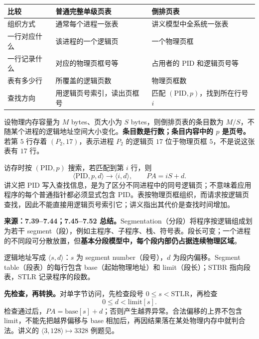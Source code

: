 \begin{center}
\begin{tabularx}{\textwidth}{@{}>{\raggedright\arraybackslash}p{3.0cm}>{\raggedright\arraybackslash}X>{\raggedright\arraybackslash}X@{}}
\toprule
比较 & 普通完整单级页表 & 倒排页表 \\
\midrule
组织方式 & 通常每个进程一张表 & 讲义模型中全系统一张表 \\
一行对应什么 & 该进程的一个逻辑页 & 一个物理页框 \\
一行记录什么 & 对应的物理页框号等 & 占用者的 PID 和逻辑页号等 \\
表有多少行 & 所覆盖的逻辑页数 & 物理页框数 \\
查找方向 & 用逻辑页号索引，读出页框号 & 匹配 $(\mathrm{PID},p)$，找到所在行号 $i$ \\
\bottomrule
\end{tabularx}
\end{center}

设物理内存容量为 $M$ bytes、页大小为 $S$ bytes，则倒排页表的条目数为 $M/S$，不随某个进程的逻辑地址空间大小变化。\textbf{条目数是行数；条目内容中的 $p$ 是页号。}若第 $5$ 行存着 $(P_2,17)$，表示进程 $P_2$ 的逻辑页 $17$ 位于物理页框 $5$，不是说这张表有 $17$ 行。

访存时按 $(\mathrm{PID},p)$ 搜索，若匹配到第 $i$ 行，则
\[
 \langle\mathrm{PID},p,d\rangle\longrightarrow\langle i,d\rangle,
 \qquad PA=iS+d.
\]
讲义把 PID 写入查找信息，是为了区分不同进程中的同号逻辑页；不意味着应用程序的每个普通指针都必须显式包含 PID。表按物理页框组织，而请求按逻辑页查找，因此不能直接用逻辑页号索引它；讲义指出其代价是查找时间增加。


\textbf{来源：7.39--7.44；7.45--7.52 总结。}Segmentation（分段）将程序按逻辑组成划为若干 segment（段），例如主程序、子程序、栈、符号表。段长可变；一个进程的不同段可分散放置，但\textbf{基本分段模型中，每个段内部仍占据连续物理区域}。

逻辑地址写成 $\langle s,d\rangle$：$s$ 为 segment number（段号），$d$ 为段内偏移。Segment table（段表）的每行包含 base（起始物理地址）和 limit（段长）；STBR 指向段表，STLR 记录程序的段数。

\textbf{先检查，再转换。}对单字节访问，先检查段号 $0\le s<\mathrm{STLR}$，再检查
\[
 0\le d<\mathrm{limit}[s].
\]
检查通过后，$\boxed{PA=\mathrm{base}[s]+d}$；否则产生越界异常。合法偏移的上界不包含 limit，不能先把越界偏移与 base 相加后，再因结果落在某处物理内存中就判合法。讲义的 $\langle3,128\rangle\mapsto3328$ 例题见。

